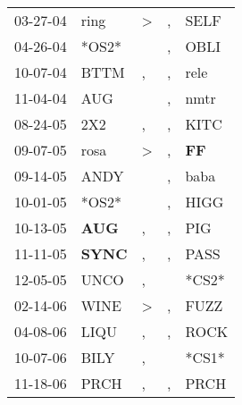 \begin{supertabular}{p{0.07\textwidth}p{0.06\textwidth}p{0.02\textwidth}p{0.02\textwidth}p{0.06\textwidth}}
 03-27-04\textsuperscript{} &           ring\textsuperscript{} &     \textgreater &             , &         SELF\textsuperscript{} \\
 04-26-04\textsuperscript{} &                            *OS2* &                  &             , &         OBLI\textsuperscript{} \\
 10-07-04\textsuperscript{} &           BTTM\textsuperscript{} &                , &             , &         rele\textsuperscript{} \\
 11-04-04\textsuperscript{} &            AUG\textsuperscript{} &                  &             , &         nmtr\textsuperscript{} \\
 08-24-05\textsuperscript{} &            2X2\textsuperscript{} &                , &             , &         KITC\textsuperscript{} \\
 09-07-05\textsuperscript{} &           rosa\textsuperscript{} &     \textgreater &             , &  \textbf{FF\textsuperscript{}} \\
 09-14-05\textsuperscript{} &           ANDY\textsuperscript{} &                  &             , &         baba\textsuperscript{} \\
 10-01-05\textsuperscript{} &                            *OS2* &                  &             , &         HIGG\textsuperscript{} \\
 10-13-05\textsuperscript{} &   \textbf{AUG\textsuperscript{}} &                , &             , &          PIG\textsuperscript{} \\
 11-11-05\textsuperscript{} &  \textbf{SYNC\textsuperscript{}} &                , &             , &         PASS\textsuperscript{} \\
 12-05-05\textsuperscript{} &           UNCO\textsuperscript{} &                , &               &                          *CS2* \\
 02-14-06\textsuperscript{} &           WINE\textsuperscript{} &     \textgreater &             , &         FUZZ\textsuperscript{} \\
 04-08-06\textsuperscript{} &           LIQU\textsuperscript{} &                , &             , &         ROCK\textsuperscript{} \\
 10-07-06\textsuperscript{} &           BILY\textsuperscript{} &                , &               &                          *CS1* \\
 11-18-06\textsuperscript{} &           PRCH\textsuperscript{} &                , &             , &         PRCH\textsuperscript{} \\

\end{supertabular}
